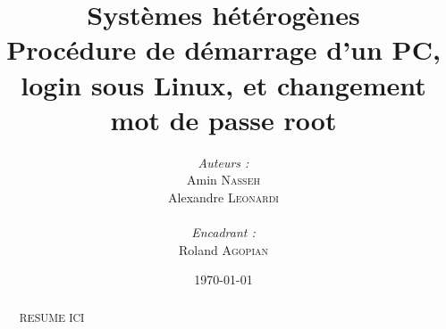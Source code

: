\documentclass[a4paper,11pt]{article}
\title{
  \textbf{Systèmes hétérogènes}\\
  Procédure de démarrage d'un PC, login sous Linux, et changement mot de passe root
}
\author{
\begin{minipage}{0.4\textwidth}
	\begin{flushleft} \large
		\emph{Auteurs :}\\
                Amin \textsc{Nasseh}\\
		Alexandre \textsc{Leonardi}\\
	\end{flushleft}
\end{minipage}
\begin{minipage}{0.4\textwidth}
	\begin{flushright} \large
		\emph{Encadrant :} \\
		Roland \textsc{Agopian}\\
	\end{flushright}
\end{minipage}
}
\date{\today}
\begin{document}
\maketitle
\thispagestyle{empty}
\begin{abstract}
RESUME ICI
\end{abstract}
\pagebreak

\tableofcontents
\pagebreak



\pagebreak

\pagebreak

\pagebreak

\pagebreak

\pagebreak
\nocite{*}

\end{document}
